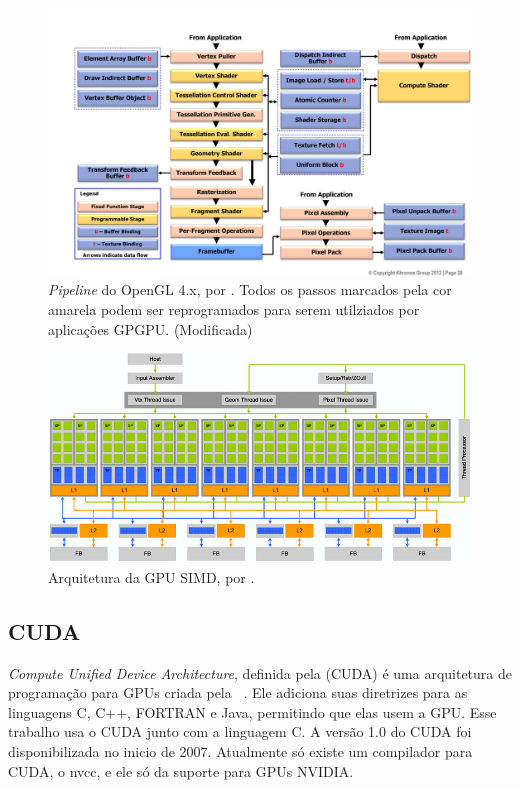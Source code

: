 \begin{figure}[H]
    \centering
    \includegraphics[width=1\textwidth]{figuras/pipeline.jpg}
    \caption{\textit{Pipeline} do OpenGL 4.x, por \citep{pipeline}. Todos os passos marcados pela cor amarela podem
    ser reprogramados para serem utilziados por aplicações GPGPU. (Modificada)}
    \label{fig:pipeline}
\end{figure}

\begin{figure}[H]
    \centering
    \includegraphics[width=1\textwidth]{figuras/simd.jpg}
    \caption{Arquitetura da GPU SIMD, por \citep{blythe2008rise}.}
    \label{fig:simd}
\end{figure}

\subsection{CUDA}
\textit{Compute Unified Device Architecture}, definida pela (CUDA) é uma arquitetura de programação para GPUs criada 
pela ~\cite{nvidia2007compute}.
Ele adiciona suas diretrizes para as linguagens C, C++, FORTRAN e Java, permitindo que elas usem a GPU.
Esse trabalho usa o CUDA junto com a linguagem C.
A versão 1.0 do CUDA foi disponibilizada no inicio de 2007. Atualmente só existe um compilador para CUDA, o nvcc,
e ele só da suporte para GPUs NVIDIA.

